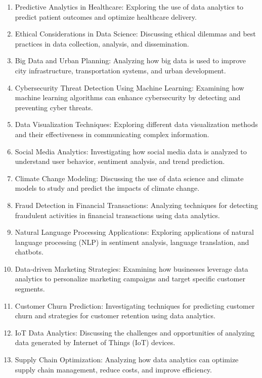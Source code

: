 \documentclass[12pt]{article}
\begin{document}
    \begin{enumerate}
        \item Predictive Analytics in Healthcare: Exploring the use of data analytics to predict patient outcomes and optimize healthcare delivery.
        \item Ethical Considerations in Data Science: Discussing ethical dilemmas and best practices in data collection, analysis, and dissemination.
        \item Big Data and Urban Planning: Analyzing how big data is used to improve city infrastructure, transportation systems, and urban development.
        \item Cybersecurity Threat Detection Using Machine Learning: Examining how machine learning algorithms can enhance cybersecurity by detecting and preventing cyber threats.
        \item Data Visualization Techniques: Exploring different data visualization methods and their effectiveness in communicating complex information.
        \item Social Media Analytics: Investigating how social media data is analyzed to understand user behavior, sentiment analysis, and trend prediction.
        \item Climate Change Modeling: Discussing the use of data science and climate models to study and predict the impacts of climate change.
        \item Fraud Detection in Financial Transactions: Analyzing techniques for detecting fraudulent activities in financial transactions using data analytics.
        \item Natural Language Processing Applications: Exploring applications of natural language processing (NLP) in sentiment analysis, language translation, and chatbots.
        \item Data-driven Marketing Strategies: Examining how businesses leverage data analytics to personalize marketing campaigns and target specific customer segments.
        \item Customer Churn Prediction: Investigating techniques for predicting customer churn and strategies for customer retention using data analytics.
        \item IoT Data Analytics: Discussing the challenges and opportunities of analyzing data generated by Internet of Things (IoT) devices.
        \item Supply Chain Optimization: Analyzing how data analytics can optimize supply chain management, reduce costs, and improve efficiency.

\end{enumerate}
\end{document}
